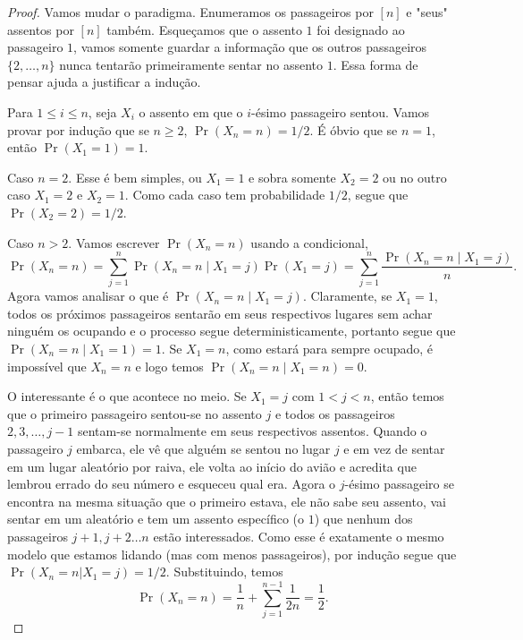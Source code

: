 \begin{proof}
	Vamos mudar o paradigma. Enumeramos os passageiros por $[n]$ e
	"seus" assentos por $[n]$ também. Esqueçamos que o assento $1$ foi designado ao
	passageiro $1$, vamos somente guardar a informação que os outros
	passageiros $\{2,\dots, n\}$ nunca tentarão primeiramente sentar no
	assento $1$.
	Essa forma de pensar ajuda a justificar a indução.

	Para $1 \leq i \leq n$, seja $X_i$ o assento em que o $i$-ésimo
	passageiro sentou.  Vamos provar por indução que se $n \geq 2$,
	$\Pr(X_n = n) = 1/2$.
	É óbvio que se $n = 1$, então $\Pr(X_1 = 1) = 1$.

	Caso $n = 2$. Esse é bem simples, ou $X_1 = 1$ e sobra somente $X_2
	= 2$ ou no outro caso $X_1 = 2$ e $X_2 = 1$. Como cada caso tem
	probabilidade $1/2$, segue que
	$\Pr(X_2 = 2) = 1/2$.

	Caso $n > 2$. Vamos escrever $\Pr(X_n = n)$ usando a condicional,
	\[
		\Pr(X_n = n) = \sum_{j = 1}^n \Pr(X_n = n \mid X_1 = j) \Pr(X_1 =
		j) = \sum_{j = 1}^n \frac{\Pr(X_n = n \mid X_1 = j)}{n}.
	\]
	Agora vamos analisar o que é $\Pr(X_n = n \mid X_1 = j)$. Claramente,
	se $X_1 = 1$, todos os próximos passageiros sentarão em seus
	respectivos lugares sem achar ninguém
	os ocupando e o processo segue deterministicamente, portanto segue
	que $\Pr(X_n = n \mid X_1 = 1) = 1$. Se $X_1 = n$, como estará para
	sempre ocupado, é impossível que
	$X_n = n$ e logo temos $\Pr(X_n = n \mid X_1 = n) = 0$.

	O interessante é o que acontece no meio. Se $X_1 = j$ com $1 < j <
	n$, então temos
	que o primeiro passageiro sentou-se no assento $j$ e todos os
	passageiros $2, 3 , \dots, j-1$ sentam-se normalmente em seus
	respectivos assentos.
	Quando o passageiro $j$ embarca, ele vê que alguém se sentou no
	lugar $j$ e em vez de sentar em um lugar aleatório por raiva, ele
	volta ao início do avião e acredita que lembrou
	errado do seu número e esqueceu qual era. Agora o $j$-ésimo
	passageiro se encontra na mesma situação que o primeiro estava, ele
	não sabe seu assento, vai sentar em um aleatório
	e tem um assento específico (o $1$) que nenhum dos passageiros $j+1,
	j+2 \dots n$ estão interessados. Como esse é exatamente o mesmo
	modelo que estamos lidando (mas com menos passageiros),
	por indução segue que $\Pr(X_n = n | X_1 = j) = 1/2$. Substituindo, temos
	\[
		\Pr(X_n = n) = \frac{1}{n} + \sum_{j = 1}^{n-1} \frac{1}{2n} = \frac{1}{2}.
	\]
\end{proof}

